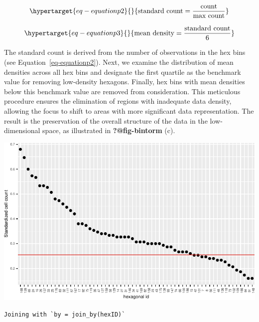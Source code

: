 \documentclass[
  12pt]{article}
\begin{document}
\begin{equation}\protect\hypertarget{eq-equationp2}{}{
 \text{standard count} = \frac{\text{count}}{\text{max count}}
}\label{eq-equationp2}\end{equation}

\begin{equation}\protect\hypertarget{eq-equationp3}{}{
 \text{mean density} = \frac{\text{standard count}}{6}
}\label{eq-equationp3}\end{equation}

The standard count is derived from the number of observations in the hex
bins (see Equation~\ref{eq-equationp2}). Next, we examine the
distribution of mean densities across all hex bins and designate the
first quartile as the benchmark value for removing low-density hexagons.
Finally, hex bins with mean densities below this benchmark value are
removed from consideration. This meticulous procedure ensures the
elimination of regions with inadequate data density, allowing the focus
to shift to areas with more significant data representation. The result
is the preservation of the overall structure of the data in the
low-dimensional space, as illustrated in \textbf{?@fig-bintorm} (c).

\includegraphics{appendix_files/figure-pdf/unnamed-chunk-14-1.pdf}

\begin{verbatim}
Joining with `by = join_by(hexID)`
\end{verbatim}
\end{document}
